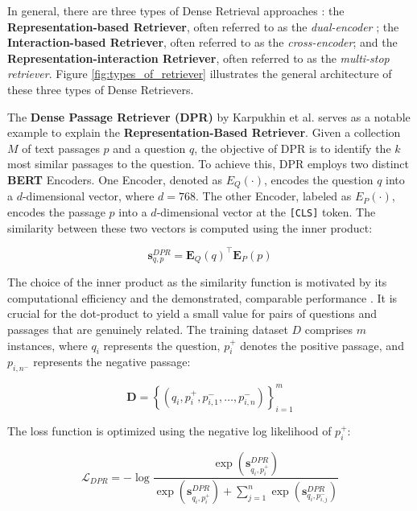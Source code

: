 In general, there are three types of Dense Retrieval approaches \cite{zhu_retrieving_2021}: the \textbf{Representation-based Retriever}, often referred to as the \textit{dual-encoder} \cite{karpukhin_dense_2020}; the \textbf{Interaction-based Retriever}, often referred to as the \textit{cross-encoder}; and the \textbf{Representation-interaction Retriever}, often referred to as the \textit{multi-stop retriever}. Figure \ref{fig:types_of_retriever} illustrates the general architecture of these three types of Dense Retrievers.

The \textbf{Dense Passage Retriever (DPR)} by Karpukhin et al. serves as a notable example to explain the \textbf{Representation-Based Retriever}. Given a collection $M$ of text passages $p$ and a question $q$, the objective of DPR is to identify the $k$ most similar passages to the question. To achieve this, DPR employs two distinct \textbf{BERT} \cite{devlin_bert_2019} Encoders. One Encoder, denoted as $E_Q(\cdot)$, encodes the question $q$ into a $d$-dimensional vector, where $d = 768$. The other Encoder, labeled as $E_P(\cdot)$, encodes the passage $p$ into a $d$-dimensional vector at the \verb|[CLS]| token. The similarity between these two vectors is computed using the inner product:


\begin{equation}
    \mathbf{s}_{q, p}^{D P R}=\mathbf{E}_{Q}(q)^{\top} \mathbf{E}_{P}(p)
    \label{eq:dpr}
\end{equation}

The choice of the inner product as the similarity function is motivated by its computational efficiency and the demonstrated, comparable performance \cite{karpukhin_dense_2020}. It is crucial for the dot-product to yield a small value for pairs of questions and passages that are genuinely related. The training dataset $D$ comprises $m$ instances, where $q_i$ represents the question, $p_i^+$ denotes the positive passage, and $p_{i,n^-}$ represents the negative passage:

\begin{equation}
    \mathbf{D}=\left\{\left(q_{i}, p_{i}^{+}, p_{i, 1}^{-}, \ldots, p_{i, n}^{-}\right)\right\}_{i=1}^{m}
\end{equation}

The loss function is optimized using the negative log likelihood of $p_i^+$:

\begin{equation}
    \mathcal{L}_{D P R}=-\log \frac{\exp \left(\mathbf{s}_{q_i,p_i^{+}}^{D P R}\right)}{\exp \left(\mathbf{s}_{q_i,p_i^{+}}^{D P R}\right) + \sum_{j=1}^{n} \exp \left(\mathbf{s}_{q_i,p_{i,j}^{-}}^{D P R}\right)}
\end{equation}

